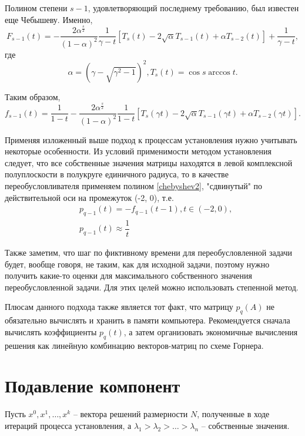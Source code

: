 \documentclass[a4paper,14pt]{extreport}
\begin{document}
Полином степени $s-1$, удовлетворяющий последнему требованию, был известен еще Чебышеву. Именно, 
	\begin{equation}
	\label{chebyshev1}
	F_{s-1}(t) =-\dfrac{2\alpha^{\frac{s}{2}}}{(1-\alpha)^2} \dfrac{1}{\gamma - t}\left[T_s(t) - 2\sqrt{\alpha} T_{s-1}(t) + \alpha T_{s-2}(t)\right] + \dfrac{1}{\gamma - t},
	\end{equation} 
где 
	$$
	\alpha= (\gamma - \sqrt{\gamma^2 - 1})^2, T_s(t) = \cos s \arccos t.
	$$

Таким образом,  
	\begin{equation}
	\label{chebyshev2}
	f_{s-1}(t) =\dfrac{1}{1-t}-\dfrac{2\alpha^{\frac{s}{2}}}{(1-\alpha)^2} \dfrac{1}{1 - t}\left[T_s(\gamma t) - 2\sqrt{\alpha} T_{s-1}(\gamma t) + \alpha T_{s-2}(\gamma t)\right].
	\end{equation}

Применяя изложенный выше подход к процессам установления нужно учитывать некоторые особенности. Из условий применимости методом установления следует, что все собственные значения матрицы находятся в левой комплексной полуплоскости в полукруге единичного радиуса, то в качестве переобусловливателя применяем полином \eqref{chebyshev2}, "сдвинутый" по действительной оси на промежуток (-2, 0), т.е.
	\begin{equation}
	\begin{aligned}
	\label{chebyshev3}
	&p_{q-1}(t) = - f_{q-1}(t-1), t \in (-2, 0),\\
	&p_{q-1}(t) \approx \dfrac{1}{t}
	\end{aligned}
	\end{equation}

Также заметим, что шаг по фиктивному времени для переобусловленной задачи будет, вообще говоря, не таким, как для исходной задачи, поэтому нужно получить какие-то оценки для максимального собственного значения переобусловленной задачи. Для этих целей можно использовать степенной метод.

Плюсам данного подхода также является тот факт, что матрицу $p_q(A)$ не обязательно вычислять и хранить в памяти компьютера. Рекомендуется сначала вычислять коэффициенты $p_q(t)$, а затем организовать экономичные вычисления решения как линейную комбинацию векторов-матриц по схеме Горнера.
  
  \section{Подавление компонент}
  \label{s:opress}
Пусть $x^0, x^1, \ldots, x^k$ -- вектора решений размерности $N$, полученные в ходе итераций процесса установления, а $\lambda_1 > \lambda_2 > \ldots > \lambda_n$ -- собственные значения.
\end{document}
